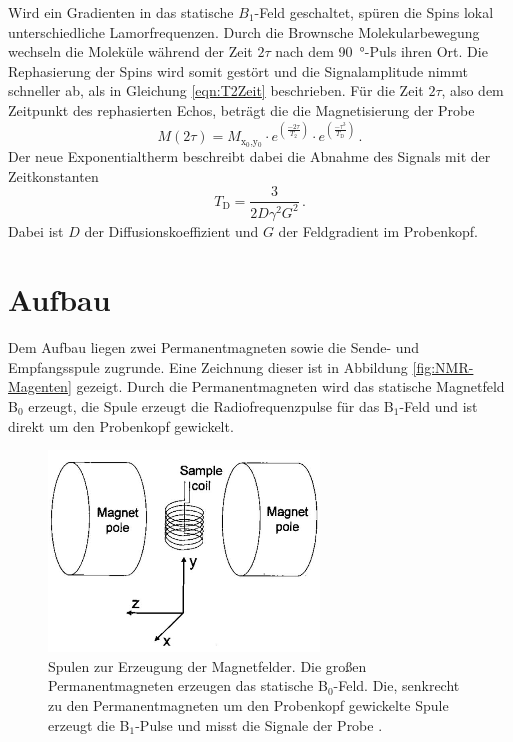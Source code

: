 Wird ein Gradienten in das statische $B_1$-Feld geschaltet, spüren die Spins lokal unterschiedliche Lamorfrequenzen.
Durch die Brownsche Molekularbewegung wechseln die Moleküle während der Zeit $2\tau$ nach dem \SI{90}{\degree}-Puls ihren Ort.
Die Rephasierung der Spins wird somit gestört und die Signalamplitude nimmt schneller ab, als in Gleichung \eqref{eqn:T2Zeit} beschrieben.
Für die Zeit $2\tau$, also dem Zeitpunkt des rephasierten Echos, beträgt die die Magnetisierung der Probe
\begin{equation}
  M(2\tau) = M_\text{x$_0$,y$_0$} \cdot e^{(\frac{-2\tau}{T_2})} \cdot e^{(\frac{-\tau^3}{T_\text{D}})} \, .
  \label{eqn:Diffusion}
\end{equation}
Der neue Exponentialtherm beschreibt dabei die Abnahme des Signals mit der Zeitkonstanten
\begin{equation}
  T_\text{D} = \frac{3}{2D \gamma^2 G^2}\,.
  \label{eqn:TDiffusion}
\end{equation}
Dabei ist $D$ der Diffusionskoeffizient und $G$ der Feldgradient im Probenkopf.


\section{Aufbau}
Dem Aufbau liegen zwei Permanentmagneten sowie die Sende- und Empfangsspule zugrunde.
Eine Zeichnung dieser ist in Abbildung \ref{fig:NMR-Magenten} gezeigt.
Durch die Permanentmagneten wird das statische Magnetfeld B$_0$ erzeugt, die Spule erzeugt die Radiofrequenzpulse für das B$_1$-Feld und ist direkt um den Probenkopf gewickelt.

\begin{figure}[H]
  \centering
  \includegraphics[width = .4\textwidth]{NMR-Magnete.png}
  \caption{Spulen zur Erzeugung der Magnetfelder. Die großen Permanentmagneten erzeugen das statische B$_0$-Feld. Die, senkrecht zu den Permanentmagneten um den Probenkopf gewickelte Spule erzeugt die B$_1$-Pulse und misst die Signale der Probe \cite{Aachen}. }
  \label{fig:NMR-Magneten}
\end{figure}

